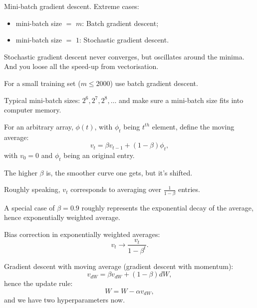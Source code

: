 \documentclass[a4paper,11pt]{article}
\begin{document}
Mini-batch gradient descent. Extreme cases:
\begin{itemize}
\item mini-batch size $=$ \textcolor{OliveGreen}{$m$}: Batch gradient descent;
\item mini-batch size $=$ \textcolor{OliveGreen}{$1$}: Stochastic gradient descent.
\end{itemize}

Stochastic gradient descent never converges, but oscillates around the minima. And you loose all the speed-up from vectorisation.

For a small training set (\textcolor{OliveGreen}{$m \leq 2000$}) use batch gradient descent.

Typical mini-batch sizes: \textcolor{OliveGreen}{$2^6, 2^7, 2^8, \ldots$} and make sure a mini-batch size fits into computer memory.

For an arbitrary array, \textcolor{OliveGreen}{$\phi (t)$}, with \textcolor{OliveGreen}{$\phi_t$} being \textcolor{OliveGreen}{$t^{th}$} element, define the moving average:
\begin{equation}
v_t = \beta v_{t-1} + \left(1 - \beta \right) \phi_t ,
\end{equation}
with \textcolor{OliveGreen}{$v_0 = 0$} and \textcolor{OliveGreen}{$\phi_t$} being an original entry.

The higher \textcolor{OliveGreen}{$\beta$} is, the smoother curve one gets, but it's shifted.

Roughly speaking, \textcolor{OliveGreen}{$v_t$} corresponds to averaging over \textcolor{OliveGreen}{$\frac{1}{1 - \beta}$} entries.

A special case of \textcolor{OliveGreen}{$\beta = 0.9$} roughly represents the exponential decay of the average, hence exponentially weighted average.

Bias correction in exponentially weighted averages:
\begin{equation}
v_t \rightarrow \frac{v_t}{1 - \beta^t} .
\end{equation}

Gradient descent with moving average (gradient descent with momentum):
\begin{equation}
v_{dW} = \beta v_{dW} + \left(1 - \beta \right) dW ,
\end{equation}
hence the update rule:
\begin{equation}
W = W - \alpha v_{dW} ,
\end{equation}
and we have two hyperparameters now.
\end{document}
